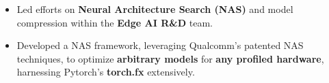 \documentclass[10pt,a4paper,ragged2e,withhyper]{altacv}
\begin{document}

\begin{paracol}{2}


    \makecvheader{}

    \vspace{-10pt}



    \begin{itemize}
        \item Led efforts on \textbf{Neural Architecture Search (NAS)} and model compression within the \textbf{Edge AI R\&D} team.

        \item Developed a NAS framework, leveraging Qualcomm's patented NAS
              techniques, to optimize \textbf{arbitrary models} for \textbf{any profiled hardware}, harnessing Pytorch's
              \textbf{torch.fx} extensively.


\end{itemize}
\end{paracol}
\end{document}
